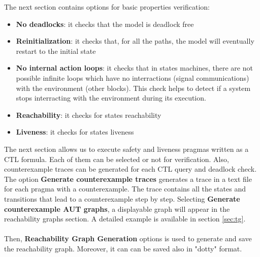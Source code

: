 \documentclass[12pt]{article}
\begin{document}
The next section contains options for basic properties verification:
\begin{itemize}
	\item \textbf{No deadlocks}: it checks that the model is deadlock free
	\item \textbf{Reinitialization}: it checks that, for all the paths, the model will eventually restart to the initial state
	\item \textbf{No internal action loops}: it checks that in states machines, there are not possible infinite loops which have no interractions (signal communications) with the environment (other blocks). This check helps to detect if a system stops interracting with the environment during its execution.
	\item \textbf{Reachability}: it checks for states reachability
	\item \textbf{Liveness}: it checks for states liveness
\end{itemize}
The next section allows us to execute safety and liveness pragmas written as a CTL formula. Each of them can be selected or not for verification. Also, counterexample traces can be generated for each CTL query and deadlock check. The option \textbf{Generate counterexample traces} generates a trace in a text file for each pragma with a counterexample. The trace contains all the states and transitions that lead to a counterexample step by step. Selecting \textbf{Generate counterexample AUT graphs}, a displayable graph will appear in the reachability graphs section. A detailed example is available in section \ref{sec:tg}.
\\\\
Then, \textbf{Reachability Graph Generation} options is used to generate and save the reachability graph. Moreover, it can can be saved also in "dotty" format.
\end{document}
